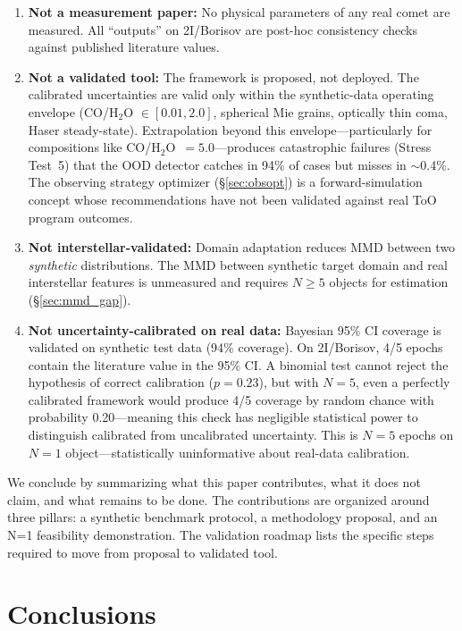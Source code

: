 \documentclass[usenatbib]{mnras}
\begin{document}
\begin{enumerate}
    \item \textbf{Not a measurement paper:} No physical parameters of any real comet are measured. All ``outputs'' on 2I/Borisov are post-hoc consistency checks against published literature values.
    \item \textbf{Not a validated tool:} The framework is proposed, not deployed. The calibrated uncertainties are valid only within the synthetic-data operating envelope (CO/H$_2$O $\in [0.01, 2.0]$, spherical Mie grains, optically thin coma, Haser steady-state). Extrapolation beyond this envelope---particularly for compositions like CO/H$_2$O~$=5.0$---produces catastrophic failures (Stress Test~5) that the OOD detector catches in 94\% of cases but misses in $\sim$0.4\%. The observing strategy optimizer (\S\ref{sec:obsopt}) is a forward-simulation concept whose recommendations have not been validated against real ToO program outcomes.
    \item \textbf{Not interstellar-validated:} Domain adaptation reduces MMD between two \textit{synthetic} distributions. The MMD between synthetic target domain and real interstellar features is unmeasured and requires $N \geq 5$ objects for estimation (\S\ref{sec:mmd_gap}).
    \item \textbf{Not uncertainty-calibrated on real data:} Bayesian 95\% CI coverage is validated on synthetic test data (94\% coverage). On 2I/Borisov, 4/5 epochs contain the literature value in the 95\% CI. A binomial test cannot reject the hypothesis of correct calibration ($p=0.23$), but with $N=5$, even a perfectly calibrated framework would produce 4/5 coverage by random chance with probability 0.20---meaning this check has negligible statistical power to distinguish calibrated from uncalibrated uncertainty. This is $N=5$ epochs on $N=1$ object---statistically uninformative about real-data calibration.
\end{enumerate}

We conclude by summarizing what this paper contributes, what it does not claim, and what remains to be done. The contributions are organized around three pillars: a synthetic benchmark protocol, a methodology proposal, and an N=1 feasibility demonstration. The validation roadmap lists the specific steps required to move from proposal to validated tool.

\section{Conclusions}\label{sec:conclusions}
\end{document}
